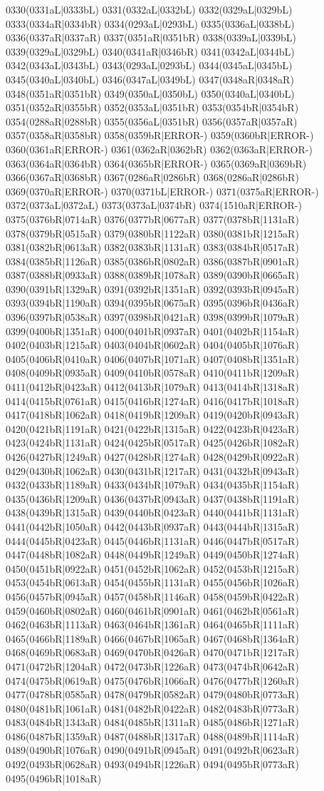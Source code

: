 0330(0331aL|0333bL) 0331(0332aL|0332bL) 0332(0329aL|0329bL) 0333(0334aR|0334bR) 0334(0293aL|0293bL) 0335(0336aL|0338bL) 0336(0337aR|0337aR) 0337(0351aR|0351bR) 0338(0339aL|0339bL) 0339(0329aL|0329bL) 0340(0341aR|0346bR) 0341(0342aL|0344bL) 0342(0343aL|0343bL) 0343(0293aL|0293bL) 0344(0345aL|0345bL) 0345(0340aL|0340bL) 0346(0347aL|0349bL) 0347(0348aR|0348aR) 0348(0351aR|0351bR) 0349(0350aL|0350bL) 0350(0340aL|0340bL) 0351(0352aR|0355bR) 0352(0353aL|0351bR) 0353(0354bR|0354bR) 0354(0288aR|0288bR) 0355(0356aL|0351bR) 0356(0357aR|0357aR) 0357(0358aR|0358bR) 0358(0359bR|ERROR-) 0359(0360bR|ERROR-) 0360(0361aR|ERROR-) 0361(0362aR|0362bR) 0362(0363aR|ERROR-) 0363(0364aR|0364bR) 0364(0365bR|ERROR-) 0365(0369aR|0369bR) 0366(0367aR|0368bR) 0367(0286aR|0286bR) 0368(0286aR|0286bR) 0369(0370aR|ERROR-) 0370(0371bL|ERROR-) 0371(0375aR|ERROR-) 0372(0373aL|0372aL) 0373(0373aL|0374bR) 0374(1510aR|ERROR-) 0375(0376bR|0714aR) 0376(0377bR|0677aR) 0377(0378bR|1131aR) 0378(0379bR|0515aR) 0379(0380bR|1122aR) 0380(0381bR|1215aR) 0381(0382bR|0613aR) 0382(0383bR|1131aR) 0383(0384bR|0517aR) 0384(0385bR|1126aR) 0385(0386bR|0802aR) 0386(0387bR|0901aR) 0387(0388bR|0933aR) 0388(0389bR|1078aR) 0389(0390bR|0665aR) 0390(0391bR|1329aR) 0391(0392bR|1351aR) 0392(0393bR|0945aR) 0393(0394bR|1190aR) 0394(0395bR|0675aR) 0395(0396bR|0436aR) 0396(0397bR|0538aR) 0397(0398bR|0421aR) 0398(0399bR|1079aR) 0399(0400bR|1351aR) 0400(0401bR|0937aR) 0401(0402bR|1154aR) 0402(0403bR|1215aR) 0403(0404bR|0602aR) 0404(0405bR|1076aR) 0405(0406bR|0410aR) 0406(0407bR|1071aR) 0407(0408bR|1351aR) 0408(0409bR|0935aR) 0409(0410bR|0578aR) 0410(0411bR|1209aR) 0411(0412bR|0423aR) 0412(0413bR|1079aR) 0413(0414bR|1318aR) 0414(0415bR|0761aR) 0415(0416bR|1274aR) 0416(0417bR|1018aR) 0417(0418bR|1062aR) 0418(0419bR|1209aR) 0419(0420bR|0943aR) 0420(0421bR|1191aR) 0421(0422bR|1315aR) 0422(0423bR|0423aR) 0423(0424bR|1131aR) 0424(0425bR|0517aR) 0425(0426bR|1082aR) 0426(0427bR|1249aR) 0427(0428bR|1274aR) 0428(0429bR|0922aR) 0429(0430bR|1062aR) 0430(0431bR|1217aR) 0431(0432bR|0943aR) 0432(0433bR|1189aR) 0433(0434bR|1079aR) 0434(0435bR|1154aR) 0435(0436bR|1209aR) 0436(0437bR|0943aR) 0437(0438bR|1191aR) 0438(0439bR|1315aR) 0439(0440bR|0423aR) 0440(0441bR|1131aR) 0441(0442bR|1050aR) 0442(0443bR|0937aR) 0443(0444bR|1315aR) 0444(0445bR|0423aR) 0445(0446bR|1131aR) 0446(0447bR|0517aR) 0447(0448bR|1082aR) 0448(0449bR|1249aR) 0449(0450bR|1274aR) 0450(0451bR|0922aR) 0451(0452bR|1062aR) 0452(0453bR|1215aR) 0453(0454bR|0613aR) 0454(0455bR|1131aR) 0455(0456bR|1026aR) 0456(0457bR|0945aR) 0457(0458bR|1146aR) 0458(0459bR|0422aR) 0459(0460bR|0802aR) 0460(0461bR|0901aR) 0461(0462bR|0561aR) 0462(0463bR|1113aR) 0463(0464bR|1361aR) 0464(0465bR|1111aR) 0465(0466bR|1189aR) 0466(0467bR|1065aR) 0467(0468bR|1364aR) 0468(0469bR|0683aR) 0469(0470bR|0426aR) 0470(0471bR|1217aR) 0471(0472bR|1204aR) 0472(0473bR|1226aR) 0473(0474bR|0642aR) 0474(0475bR|0619aR) 0475(0476bR|1066aR) 0476(0477bR|1260aR) 0477(0478bR|0585aR) 0478(0479bR|0582aR) 0479(0480bR|0773aR) 0480(0481bR|1061aR) 0481(0482bR|0422aR) 0482(0483bR|0773aR) 0483(0484bR|1343aR) 0484(0485bR|1311aR) 0485(0486bR|1271aR) 0486(0487bR|1359aR) 0487(0488bR|1317aR) 0488(0489bR|1114aR) 0489(0490bR|1076aR) 0490(0491bR|0945aR) 0491(0492bR|0623aR) 0492(0493bR|0628aR) 0493(0494bR|1226aR) 0494(0495bR|0773aR) 0495(0496bR|1018aR) 